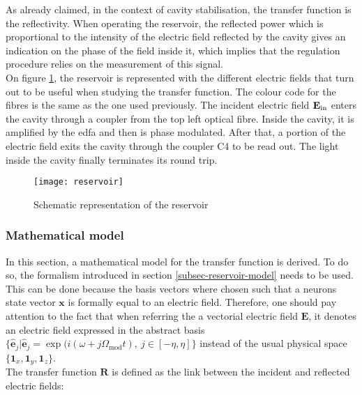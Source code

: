 As already claimed, in the context of cavity stabilisation, the transfer function is the reflectivity. When operating the reservoir, the reflected power which is proportional to the intensity of the electric field reflected by the cavity gives an indication on the phase of the field inside it, which implies that the regulation procedure relies on the measurement of this signal. \\

On figure \ref{schematic_reservoir}, the reservoir is represented with the different electric fields that turn out to be useful when studying the transfer function. The colour code for the fibres is the same as the one used previously. The incident electric field $\mathbf{E}_{\text{in}}$ enters the cavity through a coupler from the top left optical fibre. Inside the cavity, it is amplified by the \gls{edfa} and then is phase modulated. After that, a portion of the electric field exits the cavity through the coupler C4 to be read out. The light inside the cavity finally terminates its round trip.

\begin{figure}[h]
	\centering
	\texttt{[image: reservoir]}
	\caption{Schematic representation of the reservoir}
	\label{schematic_reservoir}
\end{figure}


\subsubsection{Mathematical model}

In this section, a mathematical model for the transfer function is derived. To do so, the formalism introduced in section \ref{subsec-reservoir-model} needs to be used. This can be done because the basis vectors where chosen such that a neurons state vector $\mathbf{x}$ is formally equal to an electric field. Therefore, one should pay attention to the fact that when referring the a vectorial electric field $\mathbf{E}$, it denotes an electric field expressed in the abstract basis $\{ \hat{\mathbf{e}}_j | \hat{\mathbf{e}}_j = \exp{ (i (\omega+j\Omega_{\text{mod}}t)}, ~j\in [-\eta, \eta ] \}$ instead of the usual physical space $\{\mathbf{1}_x, \mathbf{1}_y,\mathbf{1}_z \}$.\\

The transfer function $\mathbf{R}$ is defined as the link between the incident and reflected electric fields:

